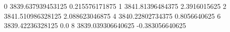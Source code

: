0 3839.637939453125 0.215576171875
1 3841.81396484375 2.3916015625
2 3841.510986328125 2.088623046875
4 3840.22802734375 0.8056640625
6 3839.42236328125 0.0
8 3839.039306640625 -0.383056640625
